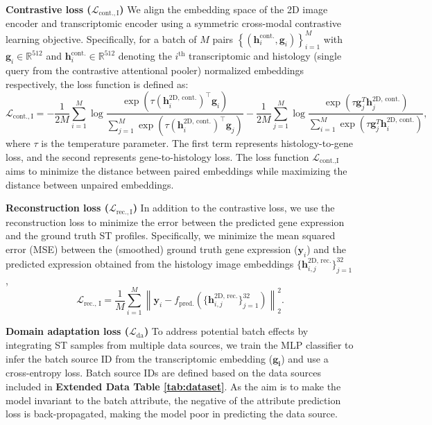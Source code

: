 \textbf{Contrastive loss ($\mathcal{L}_{\text{cont.}, \mathrm{I}}$)} We align the embedding space of the 2D image encoder and transcriptomic encoder using a symmetric cross-modal contrastive learning objective.  Specifically, for a batch of $M$ pairs $\left\{ \left( \mathbf{h}_{i}^{\text{cont.}}, \mathbf{g}_i \right) \right\}_{i=1}^{M}$ with $\mathbf{g}_{i}\in\mathbb{R}^{512}$ and $\mathbf{h}^{\text{cont.}}_{i}\in\mathbb{R}^{512}$ denoting the $i^{\text{th}}$ transcriptomic and histology (single query from the contrastive attentional pooler) normalized embeddings respectively, the loss function is defined as:
\begin{equation}
\mathcal{L}_{\text{cont.}, \mathrm{I}} = 
- \frac{1}{2M} \sum_{i=1}^{M} \log \frac{\exp\left(\tau (\mathbf{h}_{i}^{\text{2D, cont.}})^{\top} \mathbf{g}_i \right)}{\sum_{j=1}^{M} \exp\left(\tau (\mathbf{h}_{i}^{\text{2D, cont.}})^{\top} \mathbf{g}_j \right)}
- \frac{1}{2M} \sum_{j=1}^{M} \log \frac{\exp\left(\tau \mathbf{g}_j^{T} \mathbf{h}_{j}^{\text{2D, cont.}} \right)}{\sum_{i=1}^{M} \exp\left(\tau \mathbf{g}_j^{T} \mathbf{h}_{i}^{\text{2D, cont.}} \right)},
\end{equation}
where $\tau$ is the temperature parameter. The first term represents histology-to-gene loss, and the second represents gene-to-histology loss. The loss function $\mathcal{L}_{\text{cont.,I}}$ aims to minimize the distance between paired embeddings while maximizing the distance between unpaired embeddings.

\textbf{Reconstruction loss ($\mathcal{L}_{\text{rec.},\mathrm{I}}$)} In addition to the contrastive loss, we use the reconstruction loss to minimize the error between the predicted gene expression and the ground truth ST profiles. Specifically, we minimize the mean squared error (MSE) between the (smoothed) ground truth gene expression ($\mathbf{y}_i$) and the predicted expression obtained from the histology image embeddings $\{\mathbf{h}_{i,j}^{\text{2D, rec.}}\}_{j=1}^{32}$,
\begin{equation}
\mathcal{L}_{\text{rec., I}} = \frac{1}{M} \sum_{i=1}^{M} \left\| \mathbf{y}_i - f_{\text{pred.}}\left(\{\mathbf{h}_{i,j}^{\text{2D, rec.}}\}_{j=1}^{32}\right) \right\|_2^2.
\end{equation}

\textbf{Domain adaptation loss ($\mathcal{L}_{\text{da}}$)} To address potential batch effects by integrating ST samples from multiple data sources, we train the MLP classifier to infer the batch source ID from the transcriptomic embedding ($\mathbf{g_i}$) and use a cross-entropy loss. Batch source IDs are defined based on the data sources included in \textbf{Extended Data Table \ref{tab:dataset}}. As the aim is to make the model invariant to the batch attribute, the negative of the attribute prediction loss is back-propagated, making the model poor in predicting the data source. 

